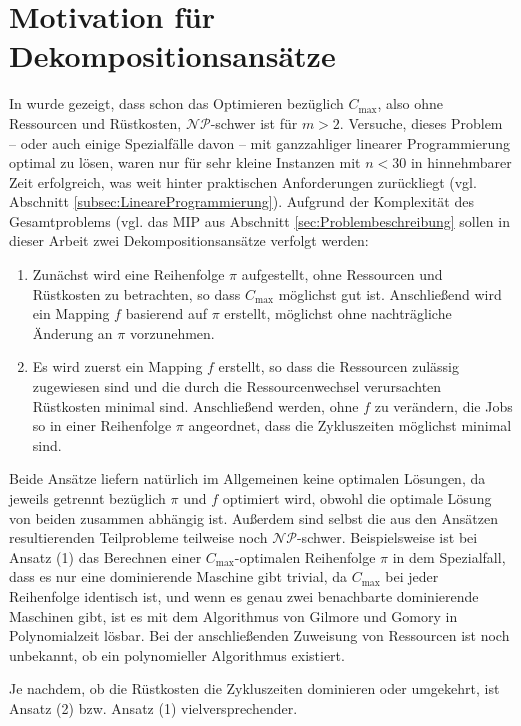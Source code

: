 \documentclass{scrreprt}
\begin{document}
\section{Motivation für Dekompositionsansätze}
In \cite{...} wurde gezeigt, dass schon das Optimieren bezüglich $C_{\max}$, also ohne Ressourcen und Rüstkosten, $\mathcal{NP}$-schwer ist für $m>2$.
Versuche, dieses Problem -- oder auch einige Spezialfälle davon -- mit ganzzahliger linearer Programmierung optimal zu lösen, waren nur für sehr kleine Instanzen mit
$n<30$ in hinnehmbarer Zeit erfolgreich, was weit hinter praktischen Anforderungen zurückliegt (vgl. Abschnitt \ref{subsec:LineareProgrammierung}).
Aufgrund der Komplexität des Gesamtproblems (vgl. das MIP aus Abschnitt \ref{sec:Problembeschreibung} sollen in dieser Arbeit zwei Dekompositionsansätze verfolgt werden:
\begin{enumerate}
    \item Zunächst wird eine Reihenfolge $\pi$ aufgestellt, ohne Ressourcen und Rüstkosten zu betrachten, so dass $C_{\max}$ möglichst gut ist.
        Anschließend wird ein Mapping $f$ basierend auf $\pi$ erstellt, möglichst ohne nachträgliche Änderung an $\pi$ vorzunehmen.
    \item Es wird zuerst ein Mapping $f$ erstellt, so dass die Ressourcen zulässig zugewiesen sind und die durch die Ressourcenwechsel verursachten Rüstkosten minimal sind.
        Anschließend werden, ohne $f$ zu verändern, die Jobs so in einer Reihenfolge $\pi$ angeordnet, dass die Zykluszeiten möglichst minimal sind.
\end{enumerate}%
Beide Ansätze liefern natürlich im Allgemeinen keine optimalen Lösungen, da jeweils getrennt bezüglich $\pi$ und $f$ optimiert wird,
obwohl die optimale Lösung von beiden zusammen abhängig ist.
Außerdem sind selbst die aus den Ansätzen resultierenden Teilprobleme teilweise noch $\mathcal{NP}$-schwer.
Beispielsweise ist bei Ansatz (1) das Berechnen einer $C_{\max}$-optimalen Reihenfolge $\pi$ in dem Spezialfall,
dass es nur eine dominierende Maschine gibt trivial, da $C_{\max}$ bei jeder Reihenfolge identisch ist,
und wenn es genau zwei benachbarte dominierende Maschinen gibt,
ist es mit dem Algorithmus von Gilmore und Gomory \cite{...} in Polynomialzeit lösbar.
Bei der anschließenden Zuweisung von Ressourcen ist noch unbekannt, ob ein polynomieller Algorithmus existiert.

Je nachdem, ob die Rüstkosten die Zykluszeiten dominieren oder umgekehrt, ist Ansatz (2) bzw. Ansatz (1) vielversprechender.
\end{document}
